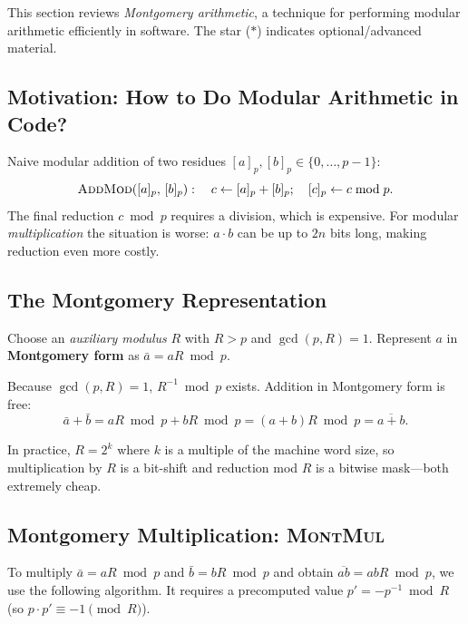 \documentclass[11pt]{article}
\begin{document}
This section reviews \emph{Montgomery arithmetic}, a technique for
performing modular arithmetic efficiently in software.  The star ($*$)
indicates optional/advanced material.

\subsection{Motivation: How to Do Modular Arithmetic in Code?}

Naive modular addition of two residues $[a]_p, [b]_p \in \{0,\ldots,p-1\}$:
\[
  \textsc{AddMod}([a]_p,\,[b]_p):\quad
  c \leftarrow [a]_p + [b]_p;\quad
  [c]_p \leftarrow c \bmod p.
\]
The final reduction $c \bmod p$ requires a division, which is expensive.
For modular \emph{multiplication} the situation is worse: $a \cdot b$ can
be up to $2n$ bits long, making reduction even more costly.

\subsection{The Montgomery Representation}

\begin{tcolorbox}[colback=blue!5, colframe=blue!40, title=Key Idea]
Choose an \emph{auxiliary modulus} $R$ with $R > p$ and $\gcd(p, R) = 1$.
Represent $a$ in \textbf{Montgomery form} as $\bar{a} = aR \bmod p$.
\end{tcolorbox}

\noindent Because $\gcd(p,R)=1$, $R^{-1} \bmod p$ exists.  Addition in
Montgomery form is free:
\[
  \bar{a} + \bar{b} = aR \bmod p + bR \bmod p = (a+b)R \bmod p = \overline{a+b}.
\]

In practice, $R = 2^k$ where $k$ is a multiple of the machine word size,
so multiplication by $R$ is a bit-shift and reduction mod $R$ is a bitwise
mask---both extremely cheap.

\subsection{Montgomery Multiplication: \textsc{MontMul}}

To multiply $\bar{a} = aR \bmod p$ and $\bar{b} = bR \bmod p$ and
obtain $\overline{ab} = abR \bmod p$, we use the following algorithm.
It requires a precomputed value $p' = -p^{-1} \bmod R$ (so
$p \cdot p' \equiv -1 \pmod{R}$).
\end{document}
